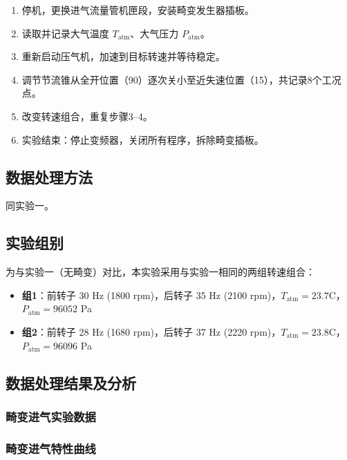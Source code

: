 \begin{enumerate}
    \item 停机，更换进气流量管机匣段，安装畸变发生器插板。
    \item 读取并记录大气温度 $T_{\text{atm}}$、大气压力 $P_{\text{atm}}$。
    \item 重新启动压气机，加速到目标转速并等待稳定。
    \item 调节节流锥从全开位置（90\textdegree{}）逐次关小至近失速位置（15\textdegree{}），共记录8个工况点。
    \item 改变转速组合，重复步骤3--4。
    \item 实验结束：停止变频器，关闭所有程序，拆除畸变插板。
\end{enumerate}

\subsection{数据处理方法}

同实验一。

\subsection{实验组别}

为与实验一（无畸变）对比，本实验采用与实验一相同的两组转速组合：

\begin{itemize}
    \item \textbf{组1}：前转子 30 Hz (1800 rpm)，后转子 35 Hz (2100 rpm)，$T_{\text{atm}}=23.7$\textdegree C，$P_{\text{atm}}=96052$ Pa
    \item \textbf{组2}：前转子 28 Hz (1680 rpm)，后转子 37 Hz (2220 rpm)，$T_{\text{atm}}=23.8$\textdegree C，$P_{\text{atm}}=96096$ Pa
\end{itemize}

\subsection{数据处理结果及分析}

\subsubsection{畸变进气实验数据}





\subsubsection{畸变进气特性曲线}

